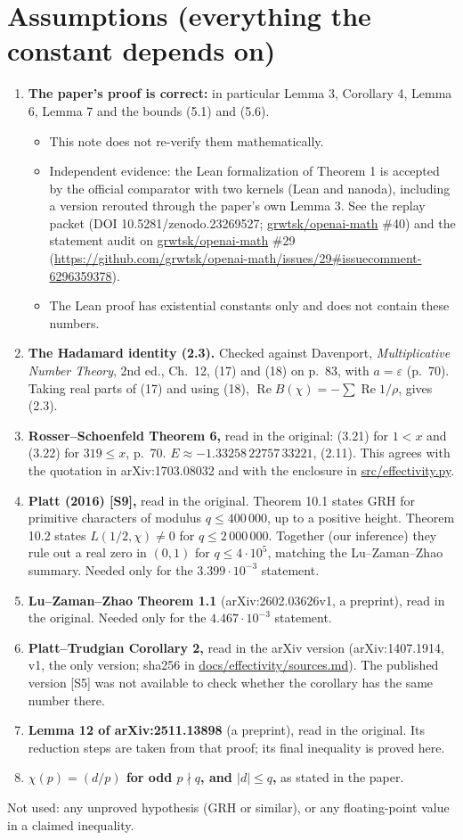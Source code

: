 \documentclass[11pt]{article}
\newcommand{\Rea}{\operatorname{Re}}
\begin{document}
\section{Assumptions (everything the constant depends on)}\label{sec:assumptions}

\begin{enumerate}
\item \textbf{The paper's proof is correct:} in particular Lemma 3, Corollary 4, Lemma 6, Lemma 7 and the bounds (5.1) and (5.6).
  \begin{itemize}
  \item This note does not re-verify them mathematically.
  \item Independent evidence: the Lean formalization of Theorem 1 is accepted by the official comparator with two kernels (Lean and nanoda), including a version rerouted through the paper's own Lemma 3. See the replay packet (DOI 10.5281/zenodo.23269527; \url{grwtsk/openai-math} \#40) and the statement audit on \url{grwtsk/openai-math} \#29 (\url{https://github.com/grwtsk/openai-math/issues/29#issuecomment-6296359378}).
  \item The Lean proof has existential constants only and does not contain these numbers.
  \end{itemize}
\item \textbf{The Hadamard identity (2.3).} Checked against Davenport, \emph{Multiplicative Number Theory}, 2nd ed., Ch.~12, (17) and (18) on p.~83, with $a=\varepsilon$ (p.~70). Taking real parts of (17) and using (18), $\Rea B(\chi) = -\sum\Rea 1/\rho$, gives (2.3).
\item \textbf{Rosser--Schoenfeld Theorem 6,} read in the original: (3.21) for $1<x$ and (3.22) for $319\le x$, p.~70. $E\approx-1.33258\,22757\,33221$, (2.11). This agrees with the quotation in arXiv:1703.08032 and with the enclosure in \url{src/effectivity.py}.
\item \textbf{Platt (2016) [S9],} read in the original. Theorem 10.1 states GRH for primitive characters of modulus $q\le 400\,000$, up to a positive height. Theorem 10.2 states $L(1/2,\chi)\ne0$ for $q\le 2\,000\,000$. Together (our inference) they rule out a real zero in $(0,1)$ for $q\le4\cdot10^5$, matching the Lu--Zaman--Zhao summary. Needed only for the $3.399\cdot10^{-3}$ statement.
\item \textbf{Lu--Zaman--Zhao Theorem 1.1} (arXiv:2602.03626v1, a preprint), read in the original. Needed only for the $4.467\cdot10^{-3}$ statement.
\item \textbf{Platt--Trudgian Corollary 2,} read in the arXiv version (arXiv:1407.1914, v1, the only version; sha256 in \url{docs/effectivity/sources.md}). The published version [S5] was not available to check whether the corollary has the same number there.
\item \textbf{Lemma 12 of arXiv:2511.13898} (a preprint), read in the original. Its reduction steps are taken from that proof; its final inequality is proved here.
\item \textbf{$\chi(p)=(d/p)$ for odd $p\nmid q$, and $|d|\le q$,} as stated in the paper.
\end{enumerate}
Not used: any unproved hypothesis (GRH or similar), or any floating-point value in a claimed inequality.
\end{document}
